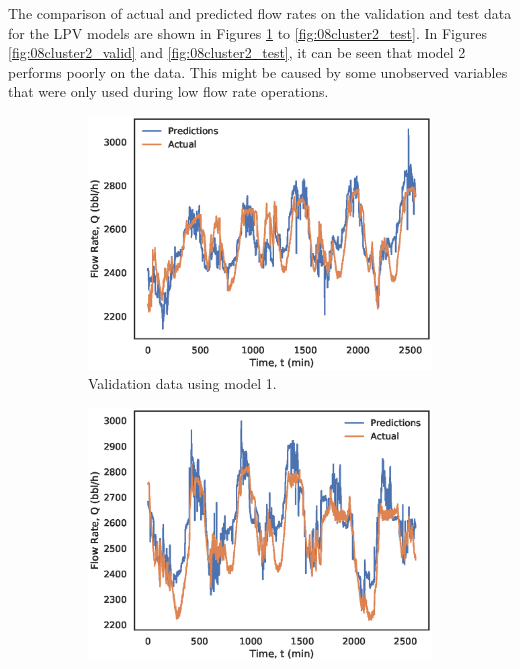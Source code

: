 The comparison of actual and predicted flow rates on the validation and test data for the LPV models are shown in Figures \ref{fig:08cluster1_valid} to \ref{fig:08cluster2_test}. In Figures \ref{fig:08cluster2_valid} and \ref{fig:08cluster2_test}, it can be seen that model 2 performs poorly on the data.  This might be caused by some unobserved variables that were only used during low flow rate operations.
\begin{figure}[h]
    \centering
     \begin{subfigure}[b]{0.48\textwidth}
         \includegraphics[width=\textwidth]{images/08cluster1_valid.eps}
         \caption{Validation data using model 1.}
         \label{fig:08cluster1_valid}
     \end{subfigure}
     \begin{subfigure}[b]{0.48\textwidth}
         \includegraphics[width=\textwidth]{images/08cluster1_test.eps}

\end{subfigure}
\end{figure}
